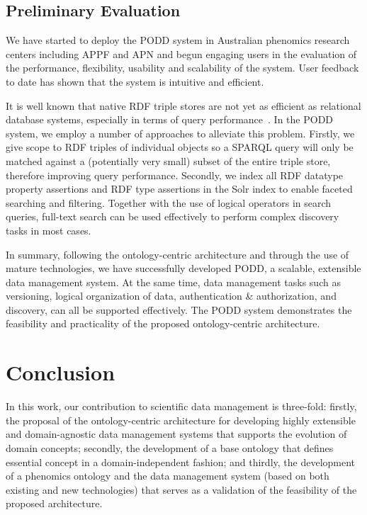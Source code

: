 \documentclass[conference,10pt]{IEEEtran}
\begin{document}
\subsection{Preliminary Evaluation}
We have started to deploy the PODD system in Australian phenomics research centers including APPF and APN and begun engaging users in the evaluation of the performance, flexibility, usability and scalability of the system. User feedback to date has shown that the system is intuitive and efficient.

It is well known that native RDF triple stores are not yet as efficient as relational database systems, especially in terms of query performance~\cite{10.1109/ICDE.2009.28,Bizer09theberlin}. In the PODD system, we employ a number of approaches to alleviate this problem. Firstly, we give scope to RDF triples of individual objects so a SPARQL query will only be matched against a (potentially very small) subset of the entire triple store, therefore improving query performance. Secondly, we index all RDF datatype property assertions and RDF type assertions in the Solr index to enable faceted searching and filtering. Together with the use of logical operators in search queries, full-text search can be used effectively to perform complex discovery tasks in most cases.

In summary, following the ontology-centric architecture and through the use of mature technologies, we have successfully developed PODD, a scalable, extensible data management system. At the same time, data management tasks such as versioning, logical organization of data, authentication \& authorization, and discovery, can all be supported effectively. The PODD system demonstrates the feasibility and practicality of the proposed ontology-centric architecture.

\section{Conclusion}\label{sec:concl}
In this work, our contribution to scientific data management is three-fold: firstly, the proposal of the ontology-centric architecture for developing highly extensible and domain-agnostic data management systems that supports the evolution of domain concepts; secondly, the development of a base ontology that defines essential concept in a domain-independent fashion; and thirdly, the development of a phenomics ontology and the data management system (based on both existing and new technologies) that serves as a validation of the feasibility of the proposed architecture. 
\end{document}
